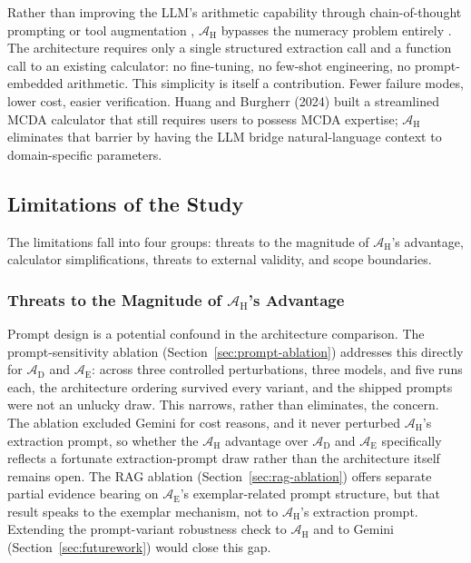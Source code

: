 \documentclass[a4paper,fleqn]{cas-dc}
\begin{document}
Rather than improving the LLM's arithmetic capability through chain-of-thought prompting or tool augmentation \citep{schick2023toolformer,gao2023pal}, $\mathcal{A}_{\text{H}}$ bypasses the numeracy problem entirely \citep{cobbe2021gsm8k,imani2023mathprompter}. The architecture requires only a single structured extraction call and a function call to an existing calculator: no fine-tuning, no few-shot engineering, no prompt-embedded arithmetic. This simplicity is itself a contribution. Fewer failure modes, lower cost, easier verification. Huang and Burgherr (2024) built a streamlined MCDA calculator that still requires users to possess MCDA expertise; $\mathcal{A}_{\text{H}}$ eliminates that barrier by having the LLM bridge natural-language context to domain-specific parameters.

\subsection{Limitations of the Study}
\label{sec:limitations}

The limitations fall into four groups: threats to the magnitude of $\mathcal{A}_{\text{H}}$'s advantage, calculator simplifications, threats to external validity, and scope boundaries.

\subsubsection{Threats to the Magnitude of $\mathcal{A}_{\text{H}}$'s Advantage}

Prompt design is a potential confound in the architecture comparison. The prompt-sensitivity ablation (Section~\ref{sec:prompt-ablation}) addresses this directly for $\mathcal{A}_{\text{D}}$ and $\mathcal{A}_{\text{E}}$: across three controlled perturbations, three models, and five runs each, the architecture ordering survived every variant, and the shipped prompts were not an unlucky draw. This narrows, rather than eliminates, the concern. The ablation excluded Gemini for cost reasons, and it never perturbed $\mathcal{A}_{\text{H}}$'s extraction prompt, so whether the $\mathcal{A}_{\text{H}}$ advantage over $\mathcal{A}_{\text{D}}$ and $\mathcal{A}_{\text{E}}$ specifically reflects a fortunate extraction-prompt draw rather than the architecture itself remains open. The RAG ablation (Section~\ref{sec:rag-ablation}) offers separate partial evidence bearing on $\mathcal{A}_{\text{E}}$'s exemplar-related prompt structure, but that result speaks to the exemplar mechanism, not to $\mathcal{A}_{\text{H}}$'s extraction prompt. Extending the prompt-variant robustness check to $\mathcal{A}_{\text{H}}$ and to Gemini (Section~\ref{sec:futurework}) would close this gap.
\end{document}
